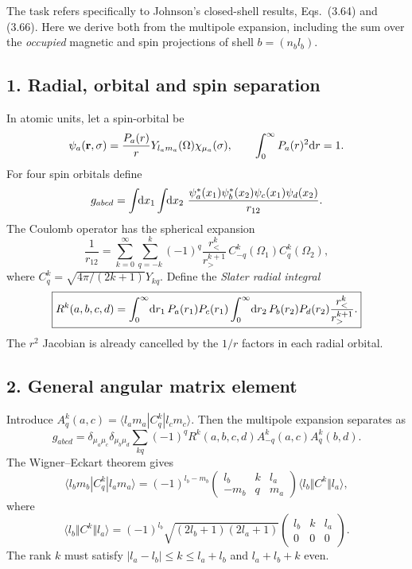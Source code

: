 The task refers specifically to Johnson's closed-shell
results, Eqs.~(3.64) and (3.66). Here we derive both
from the multipole expansion, including the sum
over the \emph{occupied} magnetic and spin projections
of shell \(b=(n_bl_b)\).

\subsection*{1. Radial, orbital and spin separation}
In atomic units, let a spin-orbital be
\[
\psi_a(\mathbf r,\sigma)=\frac{P_a(r)}r
Y_{l_am_a}(\Omega)\chi_{\mu_a}(\sigma),
\qquad\int_0^\infty P_a(r)^2\mathrm{d} r=1.
\]
For four spin orbitals define
\[
g_{abcd}=\int\!\!\mathrm{d} x_1\int\!\!\mathrm{d} x_2\
\frac{\psi_a^*(x_1)\psi_b^*(x_2)
\psi_c(x_1)\psi_d(x_2)}{r_{12}}.
\]
The Coulomb operator has the spherical expansion
\[
\frac1{r_{12}}
=\sum_{k=0}^\infty\sum_{q=-k}^{k}
(-1)^q\frac{r_<^k}{r_>^{k+1}}\,
C^k_{-q}(\Omega_1)C^k_q(\Omega_2),
\]
where \(C^k_q=\sqrt{4\pi/(2k+1)}Y_{kq}\).
Define the \emph{Slater radial integral}
\[
\boxed{\begin{aligned}
R^k(a,b,c,d)
=\int_0^\infty\!\mathrm{d} r_1\,P_a(r_1)P_c(r_1)
\int_0^\infty\!\mathrm{d} r_2\,P_b(r_2)P_d(r_2)
\frac{r_<^k}{r_>^{k+1}}.
\end{aligned}}
\]
The \(r^2\) Jacobian is already cancelled
by the \(1/r\) factors in each radial orbital.

\subsection*{2. General angular matrix element}
Introduce
\(A^k_q(a,c)=
\langle l_am_a|C^k_q|l_cm_c\rangle\).
Then the multipole expansion separates as
\[
g_{abcd}=\delta_{\mu_a\mu_c}
\delta_{\mu_b\mu_d}
\sum_{kq}(-1)^q R^k(a,b,c,d)
A^k_{-q}(a,c)A^k_q(b,d).
\]
The Wigner--Eckart theorem gives
\[
\langle l_bm_b|C^k_q|l_am_a\rangle
=(-1)^{l_b-m_b}
\begin{pmatrix}l_b&k&l_a\\-m_b&q&m_a\end{pmatrix}
\langle l_b\Vert C^k\Vert l_a\rangle,
\]
where
\[
\boxed{\langle l_b\Vert C^k\Vert l_a\rangle
=(-1)^{l_b}\sqrt{(2l_b+1)(2l_a+1)}
\begin{pmatrix}l_b&k&l_a\\0&0&0\end{pmatrix}.}
\]
The rank \(k\) must satisfy
\(|l_a-l_b|\le k\le l_a+l_b\) and
\(l_a+l_b+k\) even.


